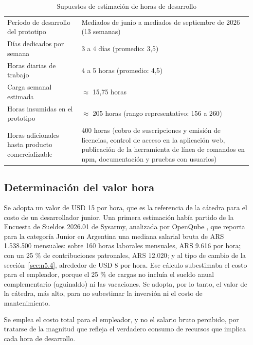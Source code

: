 \begin{table}[H]
    \centering
    \caption{Supuestos de estimación de horas de desarrollo}
    \label{tab:supuestos-horas}
    \small
    \begin{tabularx}{\textwidth}{L L}
        \toprule
         &  \\
        \midrule
        Período de desarrollo del prototipo & Mediados de junio a mediados de septiembre de 2026 (13 semanas) \\
        Días dedicados por semana & 3 a 4 días (promedio: 3,5) \\
        Horas diarias de trabajo & 4 a 5 horas (promedio: 4,5) \\
        Carga semanal estimada & $\approx$ 15,75 horas \\
        Horas insumidas en el prototipo & $\approx$ 205 horas (rango representativo: 156 a 260) \\
        Horas adicionales hasta producto comercializable & 400 horas (cobro de suscripciones y emisión de licencias, control de acceso en la aplicación web, publicación de la herramienta de línea de comandos en npm, documentación y pruebas con usuarios) \\
        \bottomrule
    \end{tabularx}
\end{table}

\subsection{Determinación del valor hora}\label{sec:n5.2.2}

Se adopta un valor de USD 15 por hora, que es la referencia de la cátedra para el costo de un desarrollador junior. Una primera estimación había partido de la Encuesta de Sueldos 2026.01 de Sysarmy, analizada por OpenQube \citep{openqube}, que reporta para la categoría Junior en Argentina una mediana salarial bruta de ARS 1.538.500 mensuales: sobre 160 horas laborales mensuales, ARS 9.616 por hora; con un 25 \% de contribuciones patronales, ARS 12.020; y al tipo de cambio de la sección~\ref{sec:n5.4}, alrededor de USD 8 por hora. Ese cálculo subestimaba el costo para el empleador, porque el 25 \% de cargas no incluía el sueldo anual complementario (aguinaldo) ni las vacaciones. Se adopta, por lo tanto, el valor de la cátedra, más alto, para no subestimar la inversión ni el costo de mantenimiento.

Se emplea el costo total para el empleador, y no el salario bruto percibido, por tratarse de la magnitud que refleja el verdadero consumo de recursos que implica cada hora de desarrollo.

